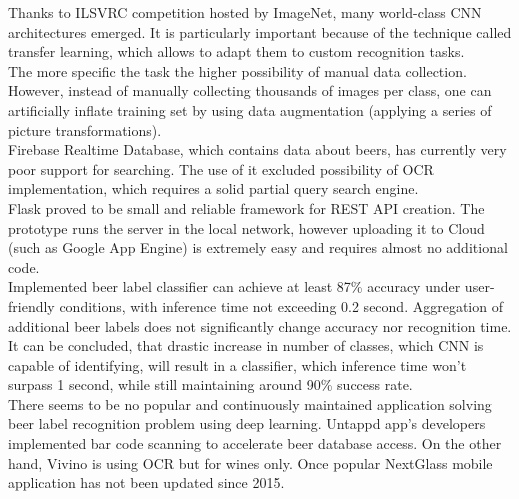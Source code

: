 \documentclass[11pt]{article}
\begin{document}
Thanks to ILSVRC competition hosted by ImageNet, many world-class CNN architectures emerged. It is particularly important because of the technique called transfer learning, which allows to adapt them to custom recognition tasks.\\

The more specific the task the higher possibility of manual data collection. However, instead of manually collecting thousands of images per class, one can artificially inflate training set by using data augmentation (applying a series of picture transformations).\\

Firebase Realtime Database, which contains data about beers, has currently very poor support for searching. The use of it excluded possibility of OCR implementation, which requires a solid partial query search engine.\\

Flask proved to be small and reliable framework for REST API creation. The prototype runs the server in the local network, however uploading it to Cloud (such as Google App Engine) is extremely easy and requires almost no additional code. \\

Implemented beer label classifier can achieve at least 87\% accuracy under user-friendly conditions, with inference time not exceeding 0.2 second. Aggregation of additional beer labels does not significantly change accuracy nor recognition time. It can be concluded, that drastic increase in number of classes, which CNN is capable of identifying, will result in a classifier, which inference time won't surpass 1 second, while still maintaining around 90\% success rate. \\

There seems to be no popular and continuously maintained application solving beer label recognition problem using deep learning. Untappd app's developers implemented bar code scanning to accelerate beer database access. On the other hand, Vivino is using OCR but for wines only. Once popular NextGlass mobile application has not been updated since 2015. 
\clearpage



\end{document}
